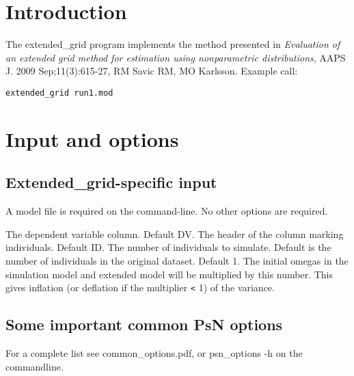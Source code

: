 




\maketitle
\newcommand{\guidetoolname}{extended\_grid}


\section{Introduction}
The extended\_grid program implements the method presented in
\emph{Evaluation of an extended grid method for estimation using nonparametric distributions}, 
AAPS J. 2009 Sep;11(3):615-27, RM Savic RM, MO Karlsson.
Example call:
\begin{verbatim}
extended_grid run1.mod
\end{verbatim}

\section{Input and options}

\subsection{Extended\_grid-specific input}

A model file is required on the command-line. No other options are required.

\begin{optionlist}
The dependent variable column. Default DV. 
\nextopt
{}
The header of the column marking individuals. Default ID. 
\nextopt
{}
The number of individuals to simulate. Default is the number of individuals in the original dataset. 
\nextopt
{}
Default 1. The initial omegas in the simulation model and extended model will be multiplied by this number. This gives inflation (or deflation if the multiplier \verb|<| 1) of the variance. 
\nextopt
\end{optionlist}


\subsection{Some important common PsN options}
For a complete list see common\_options.pdf, 
or psn\_options -h on the commandline.




